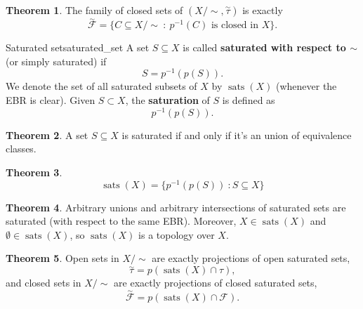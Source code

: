 \documentclass[a4paper]{book}
\theoremstyle{definition}
\newtheorem{theorem}{Theorem}[section]
\theoremstyle{ejemplo}
\theoremstyle{demostracion}
\newcommand{\quottop}{\stackrel{\sim}{\tau}}
\DeclareMathOperator{\sats}{sats}
\begin{document}
\begin{theorem}
	The family of closed sets of $(X / \sim, \quottop)$ is exactly
	\begin{equation*}
		\stackrel{\sim}{\mathcal{F}} = \{ C \subseteq X/\sim\ :\ p^{-1}(C) \text{ is closed in } X\}.
	\end{equation*}
\end{theorem}

\begin{define}{Saturated set}{saturated_set}
	A set $S \subseteq X$ is called \textbf{saturated with respect to $\sim$} (or simply saturated) if 
	\begin{equation*}
		S = p^{-1} (p(S)).
	\end{equation*}
	We denote the set of all saturated subsets of $X$ by $\sats(X)$ (whenever the EBR is clear). Given $S \subset X$, the \textbf{saturation} of $S$ is defined as
	\begin{equation*}
		p^{-1} (p(S)).
	\end{equation*}
\end{define}

\begin{theorem}
	A set $S \subseteq X$ is saturated if and only if it's an union of equivalence classes.
\end{theorem}

\begin{theorem}
	\begin{equation*}
		\sats(X) = \{p^{-1}(p(S))\ : S \subseteq X \}
	\end{equation*}
\end{theorem}

\begin{theorem}
	Arbitrary unions and arbitrary intersections of saturated sets are saturated (with respect to the same EBR). Moreover, $X \in \sats(X)$ and $\emptyset \in \sats(X)$, so $\sats(X)$ is a topology over $X$.
\end{theorem}

\begin{theorem}
	Open sets in $X / \sim$ are exactly projections of open saturated sets, 
	\begin{equation*}
		\quottop = p(\sats(X) \cap \tau),
	\end{equation*}
	and closed sets in $X / \sim$ are exactly projections of closed saturated sets,
	\begin{equation*}
		\stackrel{\sim}{\mathcal{F}} = p(\sats(X) \cap \mathcal{F}).
	\end{equation*}
\end{theorem}
\end{document}
